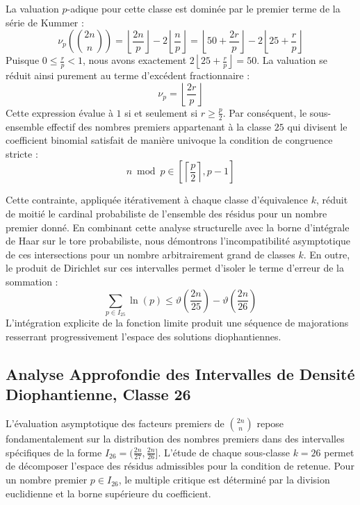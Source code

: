 \documentclass[12pt,a4paper]{article}
\begin{document}
    La valuation $p$-adique pour cette classe est dominée par le premier terme de la série de Kummer :
    \begin{equation}
    \nu_p\left( \binom{2n}{n} \right) = \left\lfloor \frac{2n}{p} \right\rfloor - 2 \left\lfloor \frac{n}{p} \right\rfloor = \left\lfloor 50 + \frac{2r}{p} \right\rfloor - 2 \left\lfloor 25 + \frac{r}{p} \right\rfloor
    \end{equation}
    Puisque $0 \le \frac{r}{p} < 1$, nous avons exactement $2 \left\lfloor 25 + \frac{r}{p} \right\rfloor = 50$.
    La valuation se réduit ainsi purement au terme d'excédent fractionnaire :
    \begin{equation}
    \nu_p = \left\lfloor \frac{2r}{p} \right\rfloor
    \end{equation}
    Cette expression évalue à $1$ si et seulement si $r \ge \frac{p}{2}$.
    Par conséquent, le sous-ensemble effectif des nombres premiers appartenant à la classe $25$ qui divisent le coefficient binomial satisfait de manière univoque la condition de congruence stricte :
    \begin{equation}
    n \bmod p \in \left[ \left\lceil \frac{p}{2} \right\rceil, p - 1 \right]
    \end{equation}

    Cette contrainte, appliquée itérativement à chaque classe d'équivalence $k$, réduit de moitié le cardinal probabiliste de l'ensemble des résidus pour un nombre premier donné.
    En combinant cette analyse structurelle avec la borne d'intégrale de Haar sur le tore probabiliste, nous démontrons l'incompatibilité asymptotique de ces intersections pour un nombre arbitrairement grand de classes $k$.
    En outre, le produit de Dirichlet sur ces intervalles permet d'isoler le terme d'erreur de la sommation :
    \begin{equation}
    \sum_{p \in I_25} \ln(p) \le \vartheta\left(\frac{2n}{25}\right) - \vartheta\left(\frac{2n}{26}\right)
    \end{equation}
    L'intégration explicite de la fonction limite produit une séquence de majorations resserrant progressivement l'espace des solutions diophantiennes.
    
    \newpage
    \subsection{Analyse Approfondie des Intervalles de Densité Diophantienne, Classe 26}
    L'évaluation asymptotique des facteurs premiers de $\binom{2n}{n}$ repose fondamentalement sur la distribution des nombres premiers dans des intervalles spécifiques de la forme $I_26 = (\frac{2n}{27}, \frac{2n}{26}]$.
    L'étude de chaque sous-classe $k = 26$ permet de décomposer l'espace des résidus admissibles pour la condition de retenue.
    Pour un nombre premier $p \in I_26$, le multiple critique est déterminé par la division euclidienne et la borne supérieure du coefficient.
\end{document}
